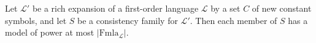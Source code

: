 \documentclass{article}
\begin{document}
Let $\mathcal{L}'$ be a rich expansion of a first-order language $\mathcal{L}$ by a set $C$ of new constant symbols, and let $S$ be a consistency family for $\mathcal{L}'$. Then each member of $S$ has a model of power at most $|\text{Fmla}_\mathcal{L}|$.
\end{document}
